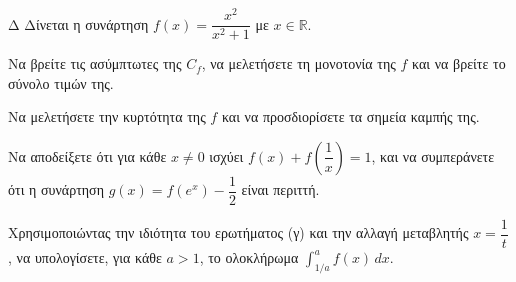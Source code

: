 \begin{thema}{Δ}
Δίνεται η συνάρτηση $f(x) = \dfrac{x^2}{x^2+1}$ με $x \in \mathbb{R}$.
\begin{erwthma}
    \item Να βρείτε τις ασύμπτωτες της $C_f$, να μελετήσετε τη μονοτονία της $f$ και να βρείτε το σύνολο τιμών της.
    \item Να μελετήσετε την κυρτότητα της $f$ και να προσδιορίσετε τα σημεία καμπής της.
    \item Να αποδείξετε ότι για κάθε $x \neq 0$ ισχύει $f(x) + f\!\left(\dfrac{1}{x}\right) = 1$, και να συμπεράνετε ότι η συνάρτηση $g(x) = f(e^x) - \dfrac{1}{2}$ είναι περιττή.
    \item Χρησιμοποιώντας την ιδιότητα του ερωτήματος (γ) και την αλλαγή μεταβλητής $x = \dfrac{1}{t}$, να υπολογίσετε, για κάθε $a > 1$, το ολοκλήρωμα $\displaystyle\int_{1/a}^{a} f(x)\,dx$.
\end{erwthma}
\end{thema}
